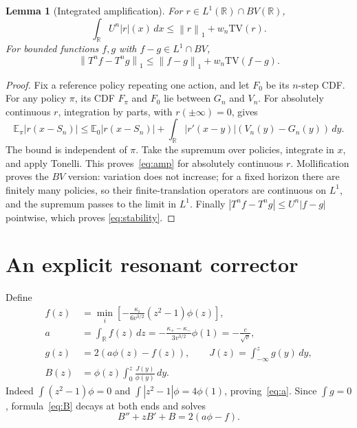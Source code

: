\documentclass[11pt]{article}
\newtheorem{lemma}[theorem]{Lemma}
\newcommand{\E}{\mathbb E}
\newcommand{\R}{\mathbb R}
\newcommand{\TV}{\mathrm{TV}}
\newcommand{\norm}[1]{\left\|#1\right\|_1}
\begin{document}
\begin{lemma}[Integrated amplification]\label{lem:amp}
For $r\in L^1(\R)\cap BV(\R)$,
\begin{equation}\label{eq:amp}
 \int_\R U^n|r|(x)\,dx\le\norm{r}+w_n\TV(r).
\end{equation}
For bounded functions $f,g$ with $f-g\in L^1\cap BV$,
\begin{equation}\label{eq:stability}
 \norm{T^nf-T^ng}\le\norm{f-g}+w_n\TV(f-g).
\end{equation}
\end{lemma}
\begin{proof}
Fix a reference policy repeating one action, and let $F_0$ be its
$n$-step CDF. For any policy $\pi$, its CDF $F_\pi$ and $F_0$ lie
between $G_n$ and $V_n$. For absolutely continuous $r$, integration by
parts, with $r(\pm\infty)=0$, gives
\[
 \E_\pi|r(x-S_n)|\le
 \E_0|r(x-S_n)|+
 \int_\R |r'(x-y)|(V_n(y)-G_n(y))\,dy.
\]
The bound is independent of $\pi$. Take the supremum over policies,
integrate in $x$, and apply Tonelli. This proves~\eqref{eq:amp} for
absolutely continuous $r$. Mollification proves the $BV$ version:
variation does not increase; for a fixed horizon there are finitely
many policies, so their finite-translation operators are continuous on
$L^1$, and the supremum passes to the limit in $L^1$.
Finally $|T^nf-T^ng|\le U^n|f-g|$ pointwise, which proves
\eqref{eq:stability}.
\end{proof}

\section{An explicit resonant corrector}
Define
\begin{align}
 f(z)&=\min_i\left[-\frac{\kappa_i}{6v^{3/2}}
                      (z^2-1)\phi(z)\right],\label{eq:forcing}\\
 a&=\int_\R f(z)\,dz=-\frac{\kappa_+-\kappa_-}{3v^{3/2}}\phi(1)
       =-\frac{c}{\sqrt v},\label{eq:a}\\
 g(z)&=2(a\phi(z)-f(z)),\qquad
 J(z)=\int_{-\infty}^z g(y)\,dy,\label{eq:J}\\
 B(z)&=\phi(z)\int_0^z\frac{J(y)}{\phi(y)}\,dy.\label{eq:B}
\end{align}
Indeed $\int(z^2-1)\phi=0$ and
$\int|z^2-1|\phi=4\phi(1)$, proving~\eqref{eq:a}.
Since $\int g=0$, formula~\eqref{eq:B} decays at both ends and solves
\begin{equation}\label{eq:ODE}
 B''+zB'+B=2(a\phi-f).
\end{equation}
\end{document}
